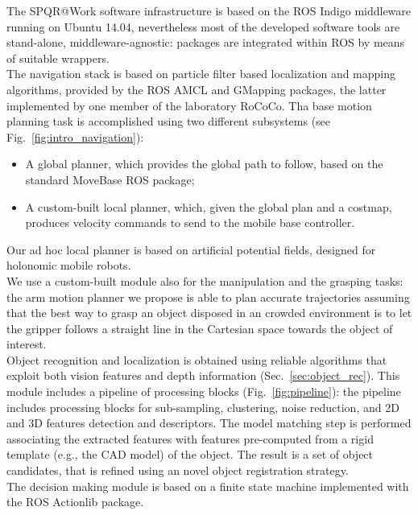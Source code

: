 \documentclass{llncs}
\begin{document}
The SPQR@Work software infrastructure is based on the ROS Indigo middleware \cite{rosweb} running on Ubuntu 14.04, nevertheless most of the developed software tools are stand-alone, middleware-agnostic: packages are integrated within ROS by means of suitable wrappers.\\
The navigation stack is based on particle filter based localization and mapping algorithms, provided by the ROS AMCL and GMapping \cite{Grisetti2007} packages, the latter implemented by one member of the laboratory RoCoCo.  Tha base motion planning task is accomplished using two different subsystems (see Fig.~\ref{fig:intro_navigation}):
\begin{itemize}
 \item A global planner, which provides the global path to follow, based on the standard MoveBase ROS package;
 \item A custom-built local planner, which, given the global plan and a costmap, produces velocity commands to send to the mobile base controller.
\end{itemize}
Our ad hoc local planner is based on artificial potential fields, designed for holonomic mobile robots.\\

We use a custom-built module also for the manipulation and the grasping tasks: the arm motion planner we propose is able to plan accurate trajectories assuming that the best way to grasp an object disposed in an crowded environment is to let the gripper follows a straight line in the Cartesian space towards the object of interest.\\

Object recognition and localization is obtained using reliable algorithms that exploit both vision features and depth information (Sec.~\ref{sec:object_rec}). This module includes a pipeline of processing blocks (Fig.~\ref{fig:pipeline}): the pipeline includes processing blocks for sub-sampling, clustering, noise reduction, and 2D and 3D features detection and descriptors. The model matching step is performed associating the extracted features with features pre-computed from a rigid template (e.g., the CAD model) of the object. The result is a set of object candidates, that is refined using an novel object registration strategy. \\

The decision making module is based on a finite state machine implemented with the ROS Actionlib package.\\
\end{document}
